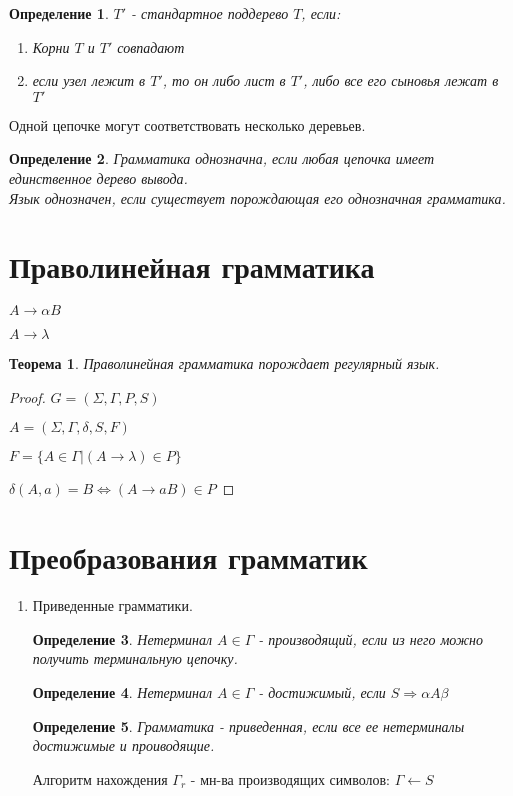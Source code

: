 \documentclass[11pt]{article}
\newtheorem*{df}{Определение}
\newtheorem*{theorem}{Теорема}
\theoremstyle{break}
\newtheorem*{proof}{Доказательство:}
\begin{document}
\begin{sloppypar}
\begin{df}
 $T'$ - стандартное поддерево $T$, если:
 \begin{enumerate}
  \item Корни $T$ и $T'$ совпадают
  \item если узел лежит в $T'$, то он либо лист в $T'$, либо все его сыновья лежат в $T'$
 \end{enumerate}
\end{df}

Одной цепочке могут соответствовать несколько деревьев.

\begin{df}
 Грамматика однозначна, если любая цепочка имеет единственное дерево вывода. \\
 Язык однозначен, если существует порождающая его однозначная грамматика.
\end{df}

\section*{Праволинейная грамматика}
$A \rightarrow \alpha B$

$A \rightarrow \lambda$

\begin{theorem}
  Праволинейная грамматика порождает регулярный язык.
\end{theorem}
\begin{proof}
  $G = (\Sigma, \Gamma, P, S)$
  
  $A = (\Sigma, \Gamma, \delta, S, F)$
  
  $F = \{A \in \Gamma | (A \rightarrow \lambda) \in P\}$
  
  $\delta(A, a) = B \Leftrightarrow (A \rightarrow aB) \in P$
\end{proof}

\section*{Преобразования грамматик}
\begin{enumerate}
\item Приведенные грамматики.
  \begin{df}
    Нетерминал $A \in \Gamma$ - производящий, если из него можно получить терминальную цепочку.
  \end{df}
  \begin{df}
    Нетерминал $A \in \Gamma$ - достижимый, если $S \Rightarrow \alpha A \beta$
  \end{df}
  \begin{df}
    Грамматика - приведенная, если все ее нетерминалы достижимые и проиводящие.
  \end{df}
  Алгоритм нахождения $\Gamma_r$ - мн-ва производящих символов:
  $\Gamma \leftarrow S$
  

\end{enumerate}
\end{sloppypar}
\end{document}
